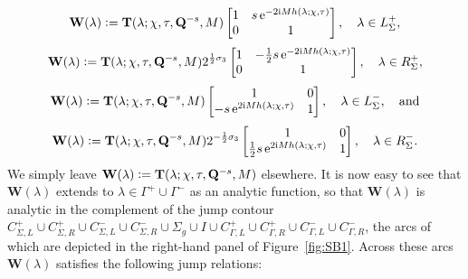 \begin{equation}
\mathbf{W}(\lambda)\vcentcolon= \mathbf{T}(\lambda;\chi,\tau,\mathbf{Q}^{-s},M) 
 \begin{bmatrix} 1 & s  \,\mathrm{e}^{-2\mathrm{i} M h(\lambda;\chi,\tau)} \\ 0 & 1 \end{bmatrix},\quad \lambda \in L^+_{\Sigma},
\end{equation}
\begin{equation}
\mathbf{W}(\lambda)\vcentcolon= \mathbf{T}(\lambda;\chi,\tau,\mathbf{Q}^{-s},M) 
2^{\frac{1}{2}\sigma_3} \begin{bmatrix} 1 & -\frac{1}{2} s \,\mathrm{e}^{-2\mathrm{i} M h(\lambda;\chi,\tau)} \\ 0 & 1 \end{bmatrix},\quad \lambda \in R^+_{\Sigma},
\end{equation}
\begin{equation}
\mathbf{W}(\lambda)\vcentcolon= \mathbf{T}(\lambda;\chi,\tau,\mathbf{Q}^{-s},M) 
 \begin{bmatrix} 1 & 0 \\ -s  \,\mathrm{e}^{2\mathrm{i} M h(\lambda;\chi,\tau)} & 1 \end{bmatrix},\quad \lambda \in L^-_{\Sigma},\quad\text{and}
\end{equation}
\begin{equation}
\mathbf{W}(\lambda)\vcentcolon= \mathbf{T}(\lambda;\chi,\tau,\mathbf{Q}^{-s},M) 
 2^{-\frac{1}{2}\sigma_3} \begin{bmatrix} 1 & 0 \\ \frac{1}{2} s \,\mathrm{e}^{2\mathrm{i} M h(\lambda;\chi,\tau)} & 1 \end{bmatrix}
,\quad \lambda \in R^-_{\Sigma}.
\label{eq:T-to-W-R-minus-Sigma-ALT}
\end{equation}
We simply leave $\mathbf{W}(\lambda) \vcentcolon=  \mathbf{T}(\lambda;\chi,\tau,\mathbf{Q}^{-s},M) $ elsewhere. It is now easy to see that $\mathbf{W}(\lambda)$ extends to $\lambda\in \Gamma^+ \cup \Gamma^-$ as an analytic function, so that $\mathbf{W}(\lambda)$ is analytic in the complement of the jump contour $C^{+}_{\Sigma,L} \cup C^{+}_{\Sigma,R} \cup C^{-}_{\Sigma,L} \cup C^{-}_{\Sigma,R} \cup \Sigma_g \cup I \cup C^{+}_{\Gamma,L} \cup C^{+}_{\Gamma,R} \cup C^{-}_{\Gamma,L} \cup C^{-}_{\Gamma,R}$, the arcs of which are depicted in the right-hand panel of Figure~\ref{fig:SB1}. Across these arcs $\mathbf{W}(\lambda) $ satisfies the following jump relations:
